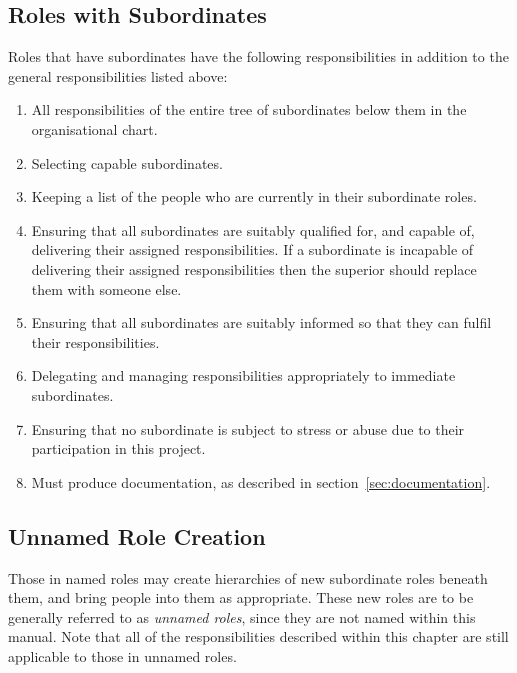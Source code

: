 \subsection{Roles with Subordinates}
\label{sec:roles-with-subordinates}
Roles that have subordinates have the following responsibilities in addition to the general responsibilities listed above:

\begin{enumerate}
\item All responsibilities of the entire tree of subordinates below them in the organisational chart.

\item Selecting capable subordinates.

\item Keeping a list of the people who are currently in their subordinate roles.

\item Ensuring that all subordinates are suitably qualified for, and capable of, delivering their assigned responsibilities.  If a subordinate is incapable of delivering their assigned responsibilities then the superior should replace them with someone else.

\item Ensuring that all subordinates are suitably informed so that they can fulfil their responsibilities.

\item Delegating and managing responsibilities appropriately to immediate subordinates.

\item Ensuring that no subordinate is subject to stress or abuse due to their participation in this project.

\item Must produce documentation, as described in section~\ref{sec:documentation}.

\end{enumerate}

\subsection{Unnamed Role Creation}

Those in named roles may create hierarchies of new subordinate roles beneath them, and bring people into them as appropriate.  These new roles are to be generally referred to as \textit{unnamed roles}, since they are not named within this manual.  Note that all of the responsibilities described within this chapter are still applicable to those in unnamed roles.


